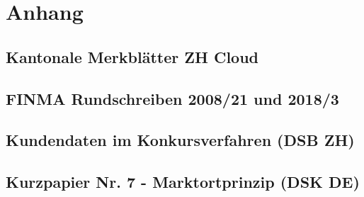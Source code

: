 \documentclass[a4paper,pointlessnumbers]{scrreprt}
\begin{document}
\chapter{Anhang}
\renewcommand{\thesection}{\Alph{section}}
\section{Kantonale Merkblätter ZH Cloud}\label{A}




\pagebreak

\section{FINMA Rundschreiben 2008/21 und 2018/3}\label{B}




\pagebreak

\section{Kundendaten im Konkursverfahren (DSB ZH)}\label{C}


\pagebreak

\section{Kurzpapier Nr. 7 - Marktortprinzip (DSK DE)}\label{D}

\end{document}
